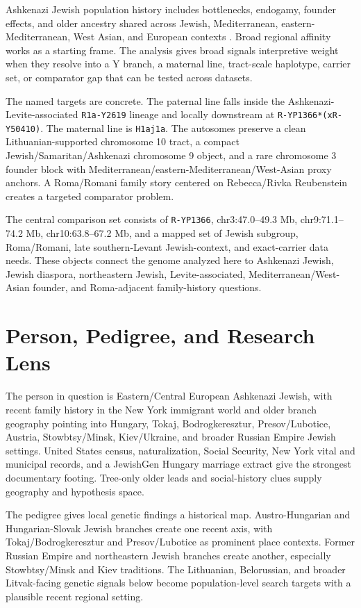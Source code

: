 \documentclass[11pt]{article}
\begin{document}
Ashkenazi Jewish population history includes bottlenecks, endogamy, founder effects, and older ancestry shared across Jewish, Mediterranean, eastern-Mediterranean, West Asian, and European contexts \citep{carmi2014,xue2017}. Broad regional affinity works as a starting frame. The analysis gives broad signals interpretive weight when they resolve into a Y branch, a maternal line, tract-scale haplotype, carrier set, or comparator gap that can be tested across datasets.

The named targets are concrete. The paternal line falls inside the Ashkenazi-Levite-associated \texttt{R1a-Y2619} lineage and locally downstream at \texttt{R-YP1366*(xR-Y50410)}. The maternal line is \texttt{H1aj1a}. The autosomes preserve a clean Lithuanian-supported chromosome 10 tract, a compact Jewish/Samaritan/Ashkenazi chromosome 9 object, and a rare chromosome 3 founder block with Mediterranean/eastern-Mediterranean/West-Asian proxy anchors. A Roma/Romani family story centered on Rebecca/Rivka Reubenstein creates a targeted comparator problem.

The central comparison set consists of \texttt{R-YP1366}, chr3:47.0--49.3 Mb, chr9:71.1--74.2 Mb, chr10:63.8--67.2 Mb, and a mapped set of Jewish subgroup, Roma/Romani, late southern-Levant Jewish-context, and exact-carrier data needs. These objects connect the genome analyzed here to Ashkenazi Jewish, Jewish diaspora, northeastern Jewish, Levite-associated, Mediterranean/West-Asian founder, and Roma-adjacent family-history questions.

\section{Person, Pedigree, and Research Lens}

The person in question is Eastern/Central European Ashkenazi Jewish, with recent family history in the New York immigrant world and older branch geography pointing into Hungary, Tokaj, Bodrogkeresztur, Presov/Lubotice, Austria, Stowbtsy/Minsk, Kiev/Ukraine, and broader Russian Empire Jewish settings. United States census, naturalization, Social Security, New York vital and municipal records, and a JewishGen Hungary marriage extract give the strongest documentary footing. Tree-only older leads and social-history clues supply geography and hypothesis space.

The pedigree gives local genetic findings a historical map. Austro-Hungarian and Hungarian-Slovak Jewish branches create one recent axis, with Tokaj/Bodrogkeresztur and Presov/Lubotice as prominent place contexts. Former Russian Empire and northeastern Jewish branches create another, especially Stowbtsy/Minsk and Kiev traditions. The Lithuanian, Belorussian, and broader Litvak-facing genetic signals below become population-level search targets with a plausible recent regional setting.
\end{document}
